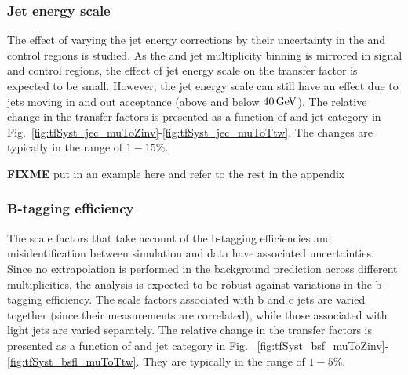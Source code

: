 \subsubsection*{Jet energy scale}
\label{sec:tfSyst_jec}
The effect of varying the jet energy corrections by their uncertainty
in the \mj and \mmj control regions is studied.  As the \scalht and
jet multiplicity binning is mirrored in signal and control regions,
the effect of jet energy scale on the transfer factor is expected to
be small.  However, the jet energy scale can still have an effect due
to jets moving in and out acceptance (above and below $40\mathrm{\,Ge\kern -0.1em V}$). The
relative change in the transfer factors is presented as a function of
\scalht and jet category in
Fig.~\ref{fig:tfSyst_jec_muToZinv}-\ref{fig:tfSyst_jec_muToTtw}.  The
changes are typically in the range of $1-15\%$.

{\bf FIXME} put in an example here and refer to the rest in the
appendix

\subsubsection*{B-tagging efficiency}
\label{sec:tfSyst_btag}
The scale factors that take account of the b-tagging efficiencies and
misidentification between simulation and data have associated
uncertainties.  Since no extrapolation is performed in the background
prediction across different \nb multiplicities, the analysis is
expected to be robust against variations in the b-tagging efficiency.
The scale factors associated with b and c jets are varied together
(since their measurements are correlated), while those associated with
light jets are varied separately.  The relative change in the transfer
factors is presented as a function of \scalht and jet category in Fig.
~\ref{fig:tfSyst_bsf_muToZinv}-\ref{fig:tfSyst_bsfl_muToTtw}.  They
are typically in the range of $1-5\%$.

